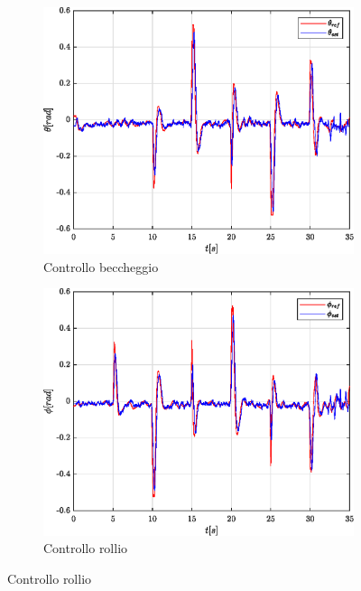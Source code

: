\begin{figure}
	\centering
	\begin{subfigure}{0.45\textwidth}
		\centering
		\includegraphics[width=1\textwidth]{Simulazioni/Figure/SMC/SQUARE/AttitudeControlPitch}
		\caption{Controllo beccheggio}
		\label{fig:SQUAREbecSMC}
	\end{subfigure}
	\hfill
	\begin{subfigure}{0.45\textwidth}
		\centering
		\includegraphics[width=1\textwidth]{Simulazioni/Figure/SMC/SQUARE/AttitudeControlRoll}
		\caption{Controllo rollio}
		\label{fig:SQUARErolSMC}
	\end{subfigure}

\end{figure}
